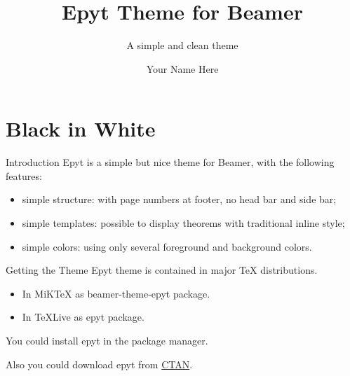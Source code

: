 \documentclass[12pt,xcolor={rgb}]{beamer}
\newcommand{\mylead}[1]{\textcolor{acolor1}{#1}}
\newcommand{\mybold}[1]{\textcolor{acolor2}{#1}}
\begin{document}
\title{Epyt Theme for Beamer}
\subtitle{A simple and clean theme}
\author{Your Name Here}

\begin{frame}[plain]\transboxout
\titlepage
\end{frame}


\section{Black in White}

\begin{frame}{Introduction}
\mylead{Epyt} is a simple but nice theme for Beamer, with the following features: \pause
\begin{itemize}[<+->]
\item simple structure: with page numbers at footer, no head bar and side bar;
\item simple templates: possible to display theorems with traditional inline style;
\item simple colors: using only several foreground and background colors.
\end{itemize}
\end{frame}

\begin{frame}{Getting the Theme}
\mylead{Epyt} theme is contained in major TeX distributions.
\begin{itemize}
  \item In MiKTeX as \mybold{beamer-theme-epyt} package.
  \item In TeXLive as \mybold{epyt} package.
\end{itemize}
You could install \mylead{epyt} in the package manager.\par\pause
Also you could download \mylead{epyt} from \href{https://www.ctan.org/pkg/epyt}{CTAN}.
\end{frame}

\end{document}
